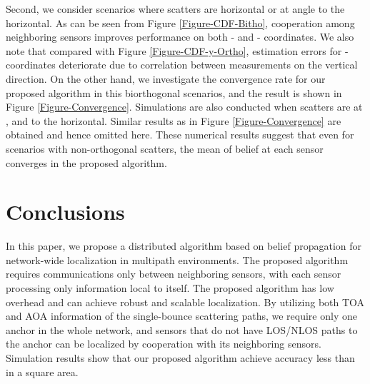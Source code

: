 \documentclass[10pt, twocolumn, final]{IEEEtran}
\begin{document}
Second, we consider scenarios where scatters are horizontal or at angle  to the horizontal. As can be seen from Figure \ref{Figure-CDF-Bitho}, cooperation among neighboring sensors improves performance on both - and - coordinates. We also note that compared with Figure \ref{Figure-CDF-y-Ortho}, estimation errors for -coordinates deteriorate due to correlation between measurements on the vertical direction. On the other hand, we investigate the convergence rate for our proposed algorithm in this biorthogonal scenarios, and the result is shown in Figure \ref{Figure-Convergence}. Simulations are also conducted when scatters are at ,  and  to the horizontal. Similar results as in Figure \ref{Figure-Convergence} are obtained and hence omitted here. These numerical results suggest that even for scenarios with non-orthogonal scatters, the mean of belief at each sensor converges in the proposed algorithm.

\section{Conclusions}\label{Section:Conclusions}
In this paper, we propose a distributed algorithm based on belief propagation for network-wide localization in multipath environments. The proposed algorithm requires communications only between neighboring sensors, with each sensor processing only information local to itself. The proposed algorithm has low overhead and can achieve robust and scalable localization. By utilizing both TOA and AOA information of the single-bounce scattering paths, we require only one anchor in the whole network, and sensors that do not have LOS/NLOS paths to the anchor can be localized by cooperation with its neighboring sensors. Simulation results show that our proposed algorithm achieve accuracy less than  in a  square area.



\end{document}
